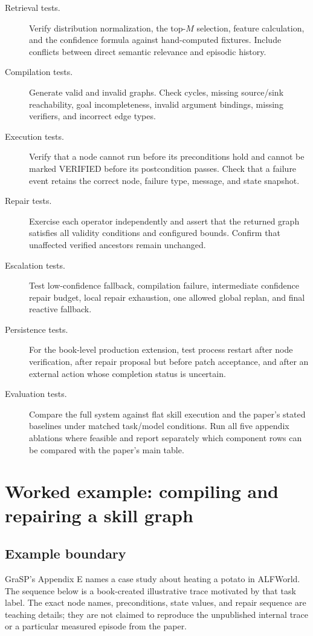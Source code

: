 \begin{description}
  \item[Retrieval tests.] Verify distribution normalization, the top-\(M\) selection, feature calculation, and the confidence formula against hand-computed fixtures. Include conflicts between direct semantic relevance and episodic history.
  \item[Compilation tests.] Generate valid and invalid graphs. Check cycles, missing source/sink reachability, goal incompleteness, invalid argument bindings, missing verifiers, and incorrect edge types.
  \item[Execution tests.] Verify that a node cannot run before its preconditions hold and cannot be marked VERIFIED before its postcondition passes. Check that a failure event retains the correct node, failure type, message, and state snapshot.
  \item[Repair tests.] Exercise each operator independently and assert that the returned graph satisfies all validity conditions and configured bounds. Confirm that unaffected verified ancestors remain unchanged.
  \item[Escalation tests.] Test low-confidence fallback, compilation failure, intermediate confidence repair budget, local repair exhaustion, one allowed global replan, and final reactive fallback.
  \item[Persistence tests.] For the book-level production extension, test process restart after node verification, after repair proposal but before patch acceptance, and after an external action whose completion status is uncertain.
  \item[Evaluation tests.] Compare the full system against flat skill execution and the paper's stated baselines under matched task/model conditions. Run all five appendix ablations where feasible and report separately which component rows can be compared with the paper's main table.
\end{description}

\section{Worked example: compiling and repairing a skill graph}
\label{sec:ch17-worked-example}

\subsection{Example boundary}

GraSP's Appendix E names a case study about heating a potato in ALFWorld. The sequence below is a book-created illustrative trace motivated by that task label. The exact node names, preconditions, state values, and repair sequence are teaching details; they are not claimed to reproduce the unpublished internal trace or a particular measured episode from the paper.\autocite{xia2026grasp}

